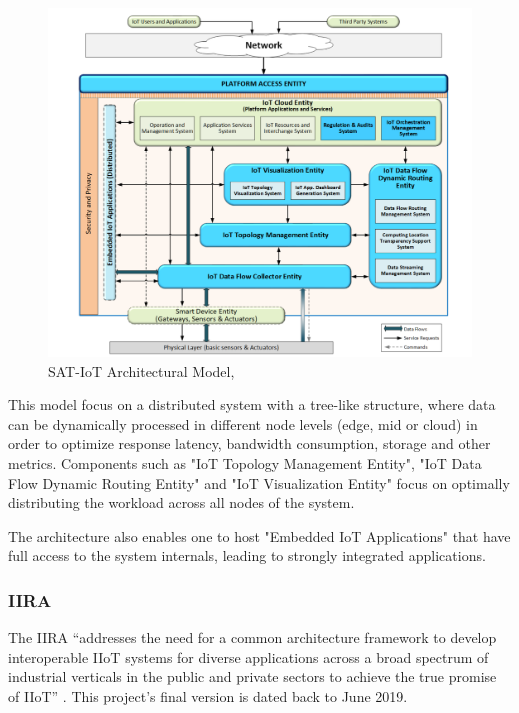 \begin{figure}[H]
    \centering
    \includegraphics[scale=0.4]{
        assets/figures/sat-iot.png
    }
    \caption[SAT-IoT Architectural Model]{SAT-IoT Architectural Model, \cite{8767282}}
    \label{fig:stateofart:arch:sat:model}
\end{figure}

This model focus on a distributed system with a tree-like structure, where data can be dynamically processed in different node levels (edge, mid or cloud) in order to optimize response latency, bandwidth consumption, storage and other metrics. Components such as "IoT Topology Management Entity", "IoT Data Flow Dynamic Routing Entity" and "IoT Visualization Entity" focus on optimally distributing the workload across all nodes of the system.

The architecture also enables one to host "Embedded IoT Applications" that have full access to the system internals, leading to strongly integrated applications.

\subsubsection{IIRA}
\label{subsubsec:stateofart:arch:iira}

The \gls{IIRA} ``addresses the need for a common architecture framework to develop interoperable IIoT systems for diverse applications across a broad spectrum of industrial verticals in the public and private sectors to achieve the true promise of IIoT'' \parencite{iira}. This project's final version is dated back to June 2019.

